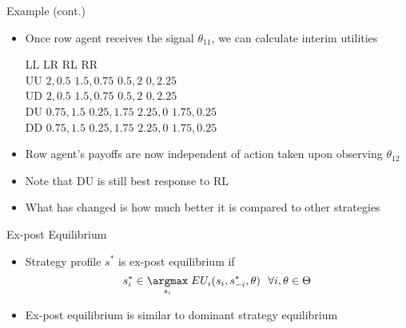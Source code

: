 \documentclass[11pt,aspectratio=169,handout]{beamer}
\begin{document}
  
  \begin{frame}{Example (cont.)}
   \begin{itemize}[<+->]
    \item Once row agent receives the signal $\theta_{11}$, we can calculate interim utilities
    \vspace{1em}
    \begin{center}\small
     \hspace{-4.9em}
     \begin{game}{4}{4}
      	\> LL			\> LR		\> RL		\> RR		\\
      UU	\> $2,0.5$		\> $1.5,0.75$	\> $0.5,2$	\> $0,2.25$	\\
      UD	\> $2,0.5$		\> $1.5,0.75$ 	\> $0.5,2$	\> $0,2.25$	\\
      DU	\> $0.75,1.5$	\> $0.25,1.75$	\> $2.25,0$	\> $1.75,0.25$	\\
      DD	\> $0.75,1.5$	\> $0.25,1.75$	\> $2.25,0$	\> $1.75,0.25$	\\
     \end{game}
    \end{center}
    \vspace{1em}
    \item Row agent's payoffs are now \alert{independent} of action taken upon observing $\theta_{12}$
    \item Note that DU is \alert{still best response} to RL
    \item What has changed is how much better it is compared to other strategies
   \end{itemize}
  \end{frame}


  \begin{frame}{Ex-post Equilibrium}
    \begin{itemize}[<+->]
    \setlength{\itemsep}{1.2em}
     \item Strategy profile $s^*$ is \alert{ex-post equilibrium} if
     $$s^*_i \in \underset{s_i}{\argmax} \; EU_i(s_i,s^*_{-i},\theta) ~~ \forall i, \theta \in \Theta$$
     \item Ex-post equilibrium is similar to \alert{dominant strategy equilibrium}
    \end{itemize}
  \end{frame}
  
\end{document}
